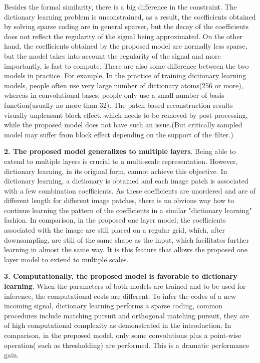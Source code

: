 \documentclass[a4paper]{article}
\begin{document}
Besides the formal similarity, there is a  big difference in the constraint. The dictionary learning problem is unconstrained, as a result, the coefficients obtained by solving sparse coding are in general sparser, but the decay of the coefficients does not reflect the regularity of the signal being approximated. On the other hand, the coefficients obtained by the proposed model are normally less sparse, but the model takes into account the regularity of the signal and more importantly, is fast to compute. There are also some difference between the two models in practice. For example, In the practice of training dictionary learning models, people often use very large number of dictionary atoms(256 or more), whereas in convolutional bases, people only use a small number of basis function(usually no more than 32). The patch based reconstruction results visually unpleasant block effect, which needs to be removed by post processing, while the proposed model does not have such an issue.(But critically sampled model may suffer from block effect depending on the support of the filter.)

\textbf{2. The proposed model generalizes to multiple layers}. Being able to extend to multiple layers is crucial to a multi-scale representation. However, dictionary learning, in its original form, cannot achieve this objective. In dictionary learning, a dictionary is obtained and each image patch is associated with a few combination coefficients. As these coefficients are unordered and are of different length for different image patches, there is no obvious way how to continue learning the pattern of the coefficients in a similar "dictionary learning" fashion. In comparison, in the proposed one layer model, the coefficients associated with the image are still placed on a regular grid, which, after downsampling, are still of the same shape as the input, which facilitates further learning in almost the same way. It is this feature that allows the proposed one layer model to extend to multiple scales. 

\textbf{3. Computationally, the proposed model is favorable to dictionary learning}. When the parameters of both models are trained and to be used for inference, the computational costs are different. To infer the codes of a new incoming signal, dictionary learning performs a sparse coding, common procedures include matching pursuit and orthogonal matching pursuit\cite{tropp2007signal}, they are of high computational complexity as demonstrated in the introduction. In comparison, in the proposed model, only some convolutions plus a point-wise operation( such as thresholding) are performed. This is a dramatic performance gain.
\end{document}
